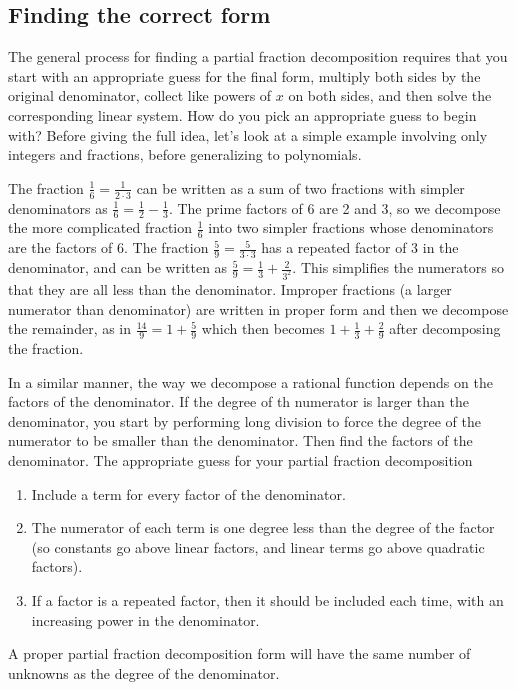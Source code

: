 \subsection{Finding the correct form}
The general process for finding a partial fraction decomposition requires that you start with an appropriate guess for the final form, multiply both sides by the original denominator, collect like powers of $x$ on both sides, and then solve the corresponding linear system. How do you pick an appropriate guess to begin with?  Before giving the full idea, let's look at a simple example involving only integers and fractions, before generalizing to polynomials.

 The fraction $\frac{1}{6} = \frac{1}{2\cdot 3}$ can be written as a sum of two fractions with simpler denominators as $\frac16=\frac12-\frac13$. The prime factors of 6 are 2 and 3, so we decompose the more complicated fraction $\frac16$ into two simpler fractions whose denominators are the factors of 6. The fraction $\frac{5}{9} = \frac{5}{3\cdot 3}$ has a repeated factor of $3$ in the denominator, and can be written as $\frac{5}{9} = \frac{1}{3}+\frac{2}{3^2}$. This simplifies the numerators so that they are all less than the denominator. Improper fractions (a larger numerator than denominator) are written in proper form and then we decompose the remainder, as in $\frac{14}{9}=1+\frac59$ which then becomes $1+\frac13+\frac29$ after decomposing the fraction.
 
In a similar manner, the way we decompose a rational function depends on the factors of the denominator.  If the degree of th numerator is larger than the denominator, you start by performing long division to force the degree of the numerator to be smaller than the denominator.  Then find the factors of the denominator.  The appropriate guess for your partial fraction decomposition 
\begin{enumerate}
	\item Include a term for every factor of the denominator.
	\item The numerator of each term is one degree less than the degree of the factor (so constants go above linear factors, and linear terms go above quadratic factors).
	\item If a factor is a repeated factor, then it should be included each time, with an increasing power in the denominator.
\end{enumerate}
A proper partial fraction decomposition form will have the same number of unknowns as the degree of the denominator.
 
